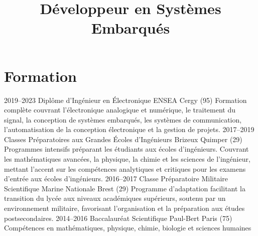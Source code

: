 \documentclass[11pt,a4paper]{moderncv}
\title{Développeur en Systèmes Embarqués}
\begin{document}
\makecvtitle

\section{Formation}
    \cventry
        {2019--2023}
        {Diplôme d'Ingénieur en Électronique}
        {ENSEA}
        {Cergy (95)}
        {}
        {Formation complète couvrant l'électronique analogique et numérique, le traitement du signal, la conception de systèmes embarqués, les systèmes de communication, l'automatisation de la conception électronique et la gestion de projets.}
    \cventry
        {2017--2019}
        {Classes Préparatoires aux Grandes Écoles d'Ingénieurs}
        {Brizeux}
        {Quimper (29)}
        {}
        {Programmes intensifs préparant les étudiants aux écoles d'ingénieurs. Couvrant les mathématiques avancées, la physique, la chimie et les sciences de l'ingénieur, mettant l'accent sur les compétences analytiques et critiques pour les examens d'entrée aux écoles d'ingénieurs.}   
    \cventry
        {2016--2017}
        {Classe Préparatoire Militaire Scientifique}
        {Marine Nationale}
        {Brest (29)}
        {}
        {Programme d'adaptation facilitant la transition du lycée aux niveaux académiques supérieurs, soutenu par un environnement militaire, favorisant l'organisation et la préparation aux études postsecondaires.}  
    \cventry
        {2014--2016}
        {Baccalauréat Scientifique}
        {Paul-Bert}
        {Paris (75)}
        {}
        {Compétences en mathématiques, physique, chimie, biologie et sciences humaines} 
        
\end{document}
